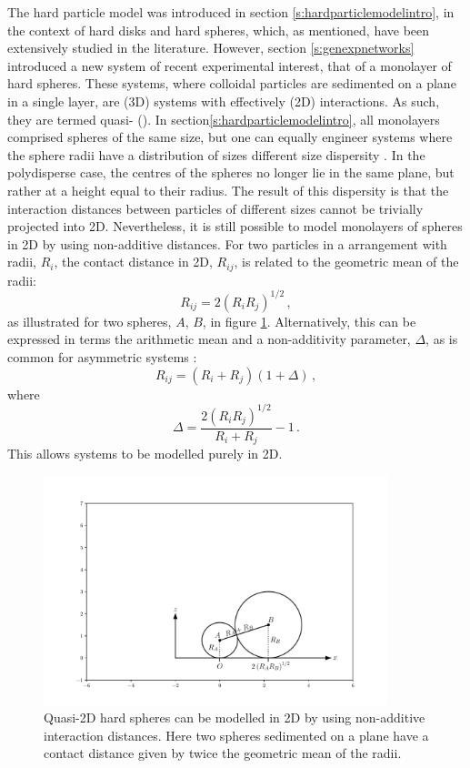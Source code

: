 The hard particle model was introduced in section \ref{s:hardparticlemodelintro}, in the context of hard disks and hard spheres, which, as mentioned, have been extensively studied in the literature.
However, section \ref{s:genexpnetworks} introduced a new system of recent experimental interest, that of a monolayer of hard spheres.
These systems, where colloidal particles are sedimented on a plane in a single layer, are \thd{} (3D) systems with effectively \td{} (2D) interactions.
As such, they are termed quasi\--\td{} (\qtd{}).
In section\ref{s:hardparticlemodelintro}, all monolayers comprised spheres of the same size, but one can equally engineer systems where the sphere radii have a distribution of sizes \ie{} different size dispersity \cite{Thorneywork2014,Thorneywork2018}.
In the polydisperse case, the centres of the spheres no longer lie in the same plane, but rather at a height equal to their radius.
The result of this dispersity is that the interaction distances between particles of different sizes cannot be trivially projected into 2D.
Nevertheless, it is still possible to model monolayers of spheres in 2D by using non\--additive distances.
For two particles in a \qtd{} arrangement with radii, $R_i$, the contact distance in 2D, $R_{ij}$, is related to the geometric mean of the radii:
\begin{equation}
	R_{ij}=2\left(R_iR_j\right)^{1/2}\,,
\end{equation}
as  illustrated for two spheres, $A$, $B$, in figure \ref{fig:nonadddemo}.
Alternatively, this can be expressed in terms the arithmetic mean and a non\--additivity parameter, $\Delta$, as is common for asymmetric systems \cite{Roth2001}:
\begin{equation}
	R_{ij}=\left(R_i+R_j\right)\left(1+\Delta\right)\,,
\end{equation}
where
\begin{equation}
	\Delta=\frac{2\left(R_iR_j\right)^{1/2}}{R_i+R_j}-1\,.
\end{equation}
This allows \qtd{} systems to be modelled purely in 2D.

\begin{figure}[bth]
     \centering
     
     \includegraphics[width=10cm]{./figures/quasi2d/quasi2d_a.pdf}
     \caption{Quasi\--2D hard spheres can be modelled in 2D by using non\--additive interaction distances. Here two spheres sedimented on a plane have a contact distance given by twice the geometric mean of the radii.}
     \label{fig:nonadddemo}
\end{figure}


